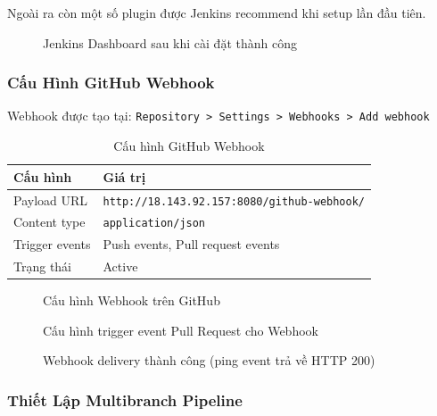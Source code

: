 Ngoài ra còn một số plugin được Jenkins recommend khi setup lần đầu tiên.

\begin{figure}[H]
\centering
{}
\caption{Jenkins Dashboard sau khi cài đặt thành công}
\end{figure}

\subsubsection{Cấu Hình GitHub Webhook}

Webhook được tạo tại: \texttt{Repository > Settings > Webhooks > Add webhook}

\begin{table}[H]
\centering
\caption{Cấu hình GitHub Webhook}
\begin{tabular}{|l|l|}
\hline
\textbf{Cấu hình} & \textbf{Giá trị} \\
\hline
Payload URL & \texttt{http://18.143.92.157:8080/github-webhook/} \\
\hline
Content type & \texttt{application/json} \\
\hline
Trigger events & Push events, Pull request events \\
\hline
Trạng thái & Active \\
\hline
\end{tabular}
\end{table}

\begin{figure}[H]
\centering
{}
\caption{Cấu hình Webhook trên GitHub}
\end{figure}

\begin{figure}[H]
\centering
{}
\caption{Cấu hình trigger event Pull Request cho Webhook}
\end{figure}

\begin{figure}[H]
\centering
{}
\caption{Webhook delivery thành công (ping event trả về HTTP 200)}
\end{figure}

\subsubsection{Thiết Lập Multibranch Pipeline}

